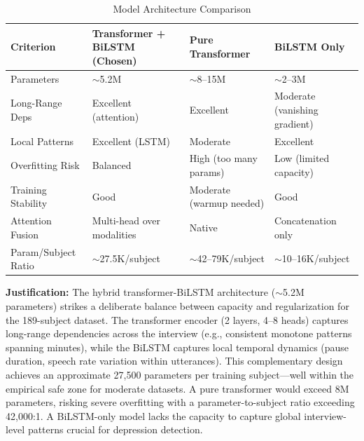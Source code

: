 \documentclass[12pt]{article}
\begin{document}
	\begin{table}[H]
		\centering
		\caption{Model Architecture Comparison}
		\small
		\begin{tabular}{|p{2.2cm}|p{2.5cm}|p{2.5cm}|p{2.5cm}|}
			\hline
			\textbf{Criterion} & \textbf{Transformer + BiLSTM (Chosen)} & \textbf{Pure Transformer} & \textbf{BiLSTM Only} \\ \hline
			Parameters & $\sim$5.2M & $\sim$8--15M & $\sim$2--3M \\ \hline
			Long-Range Deps & Excellent (attention) & Excellent & Moderate (vanishing gradient) \\ \hline
			Local Patterns & Excellent (LSTM) & Moderate & Excellent \\ \hline
			Overfitting Risk & Balanced & High (too many params) & Low (limited capacity) \\ \hline
			Training Stability & Good & Moderate (warmup needed) & Good \\ \hline
			Attention Fusion & Multi-head over modalities & Native & Concatenation only \\ \hline
			Param/Subject Ratio & $\sim$27.5K/subject & $\sim$42--79K/subject & $\sim$10--16K/subject \\ \hline
		\end{tabular}
	\end{table}

	\textbf{Justification:} The hybrid transformer-BiLSTM architecture ($\sim$5.2M parameters) strikes a deliberate balance between capacity and regularization for the 189-subject dataset. The transformer encoder (2 layers, 4--8 heads) captures long-range dependencies across the interview (e.g., consistent monotone patterns spanning minutes), while the BiLSTM captures local temporal dynamics (pause duration, speech rate variation within utterances). This complementary design achieves an approximate 27,500 parameters per training subject---well within the empirical safe zone for moderate datasets. A pure transformer would exceed 8M parameters, risking severe overfitting with a parameter-to-subject ratio exceeding 42,000:1. A BiLSTM-only model lacks the capacity to capture global interview-level patterns crucial for depression detection.
\end{document}

